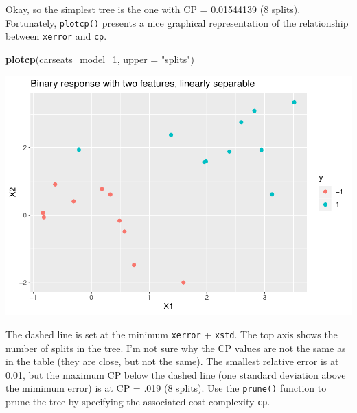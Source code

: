 \documentclass[
]{book}
\newenvironment{Shaded}{\begin{snugshade}}{\end{snugshade}}
\newcommand{\DataTypeTok}[1]{\textcolor[rgb]{0.13,0.29,0.53}{#1}}
\newcommand{\DecValTok}[1]{\textcolor[rgb]{0.00,0.00,0.81}{#1}}
\newcommand{\KeywordTok}[1]{\textcolor[rgb]{0.13,0.29,0.53}{\textbf{#1}}}
\newcommand{\NormalTok}[1]{#1}
\newcommand{\OperatorTok}[1]{\textcolor[rgb]{0.81,0.36,0.00}{\textbf{#1}}}
\newcommand{\OtherTok}[1]{\textcolor[rgb]{0.56,0.35,0.01}{#1}}
\newcommand{\StringTok}[1]{\textcolor[rgb]{0.31,0.60,0.02}{#1}}
\begin{document}
Okay, so the simplest tree is the one with CP = 0.01544139 (8 splits). Fortunately, \texttt{plotcp()} presents a nice graphical representation of the relationship between \texttt{xerror} and \texttt{cp}.

\begin{Shaded}
\begin{Highlighting}[]
\KeywordTok{plotcp}\NormalTok{(carseats_model_}\DecValTok{1}\NormalTok{, }\DataTypeTok{upper =} \StringTok{"splits"}\NormalTok{)}
\end{Highlighting}
\end{Shaded}

\includegraphics{data-sci_files/figure-latex/unnamed-chunk-100-1.pdf}

The dashed line is set at the minimum \texttt{xerror} + \texttt{xstd}. The top axis shows the number of splits in the tree. I'm not sure why the CP values are not the same as in the table (they are close, but not the same). The smallest relative error is at 0.01, but the maximum CP below the dashed line (one standard deviation above the mimimum error) is at CP = .019 (8 splits). Use the \texttt{prune()} function to prune the tree by specifying the associated cost-complexity \texttt{cp}.

\begin{Shaded}
\end{Shaded}
\end{document}

